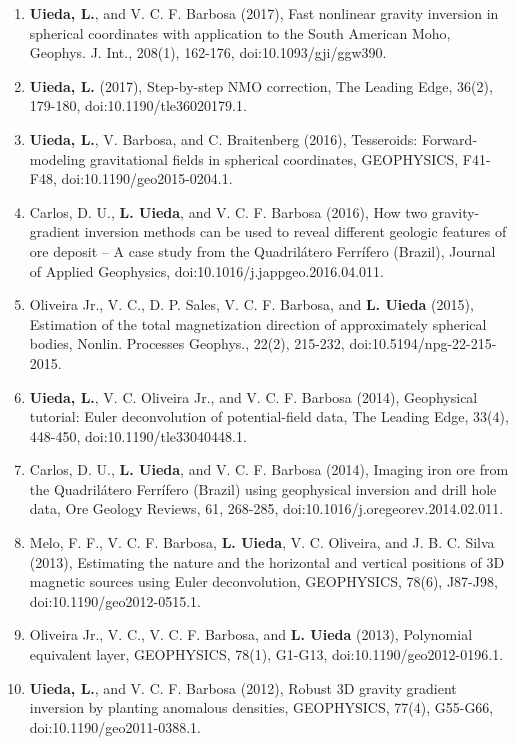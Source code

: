 \documentclass[12pt,a4paper,oneside,titlepage,onecolumn]{article}
\begin{document}
\begin{enumerate}
\item \textbf{Uieda, L.}, and V. C. F. Barbosa (2017), Fast nonlinear gravity inversion in spherical coordinates with application to the South American Moho, Geophys. J. Int., 208(1), 162-176, doi:10.1093/gji/ggw390.
\item \textbf{Uieda, L.} (2017), Step-by-step NMO correction, The Leading Edge, 36(2), 179-180, doi:10.1190/tle36020179.1.
\item \textbf{Uieda, L.}, V. Barbosa, and C. Braitenberg (2016), Tesseroids: Forward-modeling gravitational fields in spherical coordinates, GEOPHYSICS, F41-F48, doi:10.1190/geo2015-0204.1.
\item Carlos, D. U., \textbf{L. Uieda}, and V. C. F. Barbosa (2016), How two gravity-gradient inversion methods can be used to reveal different geologic features of ore deposit -- A case study from the Quadrilátero Ferrífero (Brazil), Journal of Applied Geophysics, doi:10.1016/j.jappgeo.2016.04.011.
\item Oliveira Jr., V. C., D. P. Sales, V. C. F. Barbosa, and \textbf{L. Uieda} (2015), Estimation of the total magnetization direction of approximately spherical bodies, Nonlin. Processes Geophys., 22(2), 215-232, doi:10.5194/npg-22-215-2015.
\item \textbf{Uieda, L.}, V. C. Oliveira Jr., and V. C. F. Barbosa (2014), Geophysical tutorial: Euler deconvolution of potential-field data, The Leading Edge, 33(4), 448-450, doi:10.1190/tle33040448.1.
\item Carlos, D. U., \textbf{L. Uieda}, and V. C. F. Barbosa (2014), Imaging iron ore from the Quadrilátero Ferrífero (Brazil) using geophysical inversion and drill hole data, Ore Geology Reviews, 61, 268-285, doi:10.1016/j.oregeorev.2014.02.011.
\item Melo, F. F., V. C. F. Barbosa, \textbf{L. Uieda}, V. C. Oliveira, and J. B. C. Silva (2013), Estimating the nature and the horizontal and vertical positions of 3D magnetic sources using Euler deconvolution, GEOPHYSICS, 78(6), J87-J98, doi:10.1190/geo2012-0515.1.
\item Oliveira Jr., V. C., V. C. F. Barbosa, and \textbf{L. Uieda} (2013), Polynomial equivalent layer, GEOPHYSICS, 78(1), G1-G13, doi:10.1190/geo2012-0196.1.
\item \textbf{Uieda, L.}, and V. C. F. Barbosa (2012), Robust 3D gravity gradient inversion by planting anomalous densities, GEOPHYSICS, 77(4), G55-G66, doi:10.1190/geo2011-0388.1.
\end{enumerate}
\end{document}

